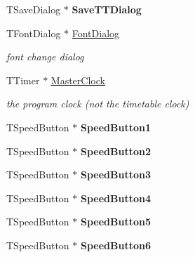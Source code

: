 \begin{DoxyCompactItemize}
T\+Save\+Dialog $\ast$ {\bfseries Save\+T\+T\+Dialog}
\item 
\mbox{\label{class_t_interface_a60a9276c65b1612112ea2dd020ea353c}} 
T\+Font\+Dialog $\ast$ \mbox{\hyperlink{class_t_interface_a60a9276c65b1612112ea2dd020ea353c}{Font\+Dialog}}
\begin{DoxyCompactList}\small\item\em font change dialog \end{DoxyCompactList}\item 
\mbox{\label{class_t_interface_a86ed4cb82f825abe93c1df870d2bf4d2}} 
T\+Timer $\ast$ \mbox{\hyperlink{class_t_interface_a86ed4cb82f825abe93c1df870d2bf4d2}{Master\+Clock}}
\begin{DoxyCompactList}\small\item\em the program clock (not the timetable clock) \end{DoxyCompactList}\item 
\mbox{\label{class_t_interface_aec3fdfb6671fe92b1858d1deb5d9156a}} 
T\+Speed\+Button $\ast$ {\bfseries Speed\+Button1}
\item 
\mbox{\label{class_t_interface_a54ddc802547860142f7dfe8929c57b66}} 
T\+Speed\+Button $\ast$ {\bfseries Speed\+Button2}
\item 
\mbox{\label{class_t_interface_abb3c3fdc2b7723531ef0c3c937561f6f}} 
T\+Speed\+Button $\ast$ {\bfseries Speed\+Button3}
\item 
\mbox{\label{class_t_interface_a5be15e255b615bc628f5fbf0ed6e4a58}} 
T\+Speed\+Button $\ast$ {\bfseries Speed\+Button4}
\item 
\mbox{\label{class_t_interface_ace77f7d60b09aac528d6ea747c221ca5}} 
T\+Speed\+Button $\ast$ {\bfseries Speed\+Button5}
\item 
\mbox{\label{class_t_interface_ac5d64e9e9f8cc4dac6ae4ffe51d86f3c}} 
T\+Speed\+Button $\ast$ {\bfseries Speed\+Button6}
\item 
\mbox{\label{class_t_interface_aaa3c803c41b5d1c38783587ddc38513f}} 

\end{DoxyCompactItemize}
